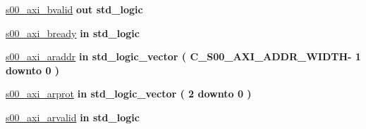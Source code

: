 \begin{DoxyCompactItemize}
\hyperlink{classGPIO__v1__0_a5110b7dd4fb9548a2aab88f50dbe1d5e}{s00\+\_\+axi\+\_\+bvalid}  {\bfseries {\bfseries \textcolor{vhdlchar}{out}\textcolor{vhdlchar}{ }}} {\bfseries \textcolor{vhdlchar}{std\+\_\+logic}\textcolor{vhdlchar}{ }} 
\item 
\mbox{\label{classGPIO__v1__0_a1ef2019b0613bc23d4829eeeb24eb98d}} 
\hyperlink{classGPIO__v1__0_a1ef2019b0613bc23d4829eeeb24eb98d}{s00\+\_\+axi\+\_\+bready}  {\bfseries {\bfseries \textcolor{vhdlchar}{in}\textcolor{vhdlchar}{ }}} {\bfseries \textcolor{vhdlchar}{std\+\_\+logic}\textcolor{vhdlchar}{ }} 
\item 
\mbox{\label{classGPIO__v1__0_af70a86336cd6505064e45b69f4623939}} 
\hyperlink{classGPIO__v1__0_af70a86336cd6505064e45b69f4623939}{s00\+\_\+axi\+\_\+araddr}  {\bfseries {\bfseries \textcolor{vhdlchar}{in}\textcolor{vhdlchar}{ }}} {\bfseries \textcolor{vhdlchar}{std\+\_\+logic\+\_\+vector}\textcolor{vhdlchar}{ }\textcolor{vhdlchar}{(}\textcolor{vhdlchar}{ }\textcolor{vhdlchar}{ }\textcolor{vhdlchar}{ }\textcolor{vhdlchar}{ }\textcolor{vhdlchar}{C\+\_\+\+S00\+\_\+\+A\+X\+I\+\_\+\+A\+D\+D\+R\+\_\+\+W\+I\+D\+TH}\textcolor{vhdlchar}{-\/}\textcolor{vhdlchar}{ } \textcolor{vhdldigit}{1} \textcolor{vhdlchar}{ }\textcolor{vhdlchar}{downto}\textcolor{vhdlchar}{ }\textcolor{vhdlchar}{ } \textcolor{vhdldigit}{0} \textcolor{vhdlchar}{ }\textcolor{vhdlchar}{)}\textcolor{vhdlchar}{ }} 
\item 
\mbox{\label{classGPIO__v1__0_adc648df07895bf808b8c721e1dc6811b}} 
\hyperlink{classGPIO__v1__0_adc648df07895bf808b8c721e1dc6811b}{s00\+\_\+axi\+\_\+arprot}  {\bfseries {\bfseries \textcolor{vhdlchar}{in}\textcolor{vhdlchar}{ }}} {\bfseries \textcolor{vhdlchar}{std\+\_\+logic\+\_\+vector}\textcolor{vhdlchar}{ }\textcolor{vhdlchar}{(}\textcolor{vhdlchar}{ }\textcolor{vhdlchar}{ } \textcolor{vhdldigit}{2} \textcolor{vhdlchar}{ }\textcolor{vhdlchar}{downto}\textcolor{vhdlchar}{ }\textcolor{vhdlchar}{ } \textcolor{vhdldigit}{0} \textcolor{vhdlchar}{ }\textcolor{vhdlchar}{)}\textcolor{vhdlchar}{ }} 
\item 
\mbox{\label{classGPIO__v1__0_a94b78b2ae3cd13860f15afbdfb199e44}} 
\hyperlink{classGPIO__v1__0_a94b78b2ae3cd13860f15afbdfb199e44}{s00\+\_\+axi\+\_\+arvalid}  {\bfseries {\bfseries \textcolor{vhdlchar}{in}\textcolor{vhdlchar}{ }}} {\bfseries \textcolor{vhdlchar}{std\+\_\+logic}\textcolor{vhdlchar}{ }} 

\end{DoxyCompactItemize}
